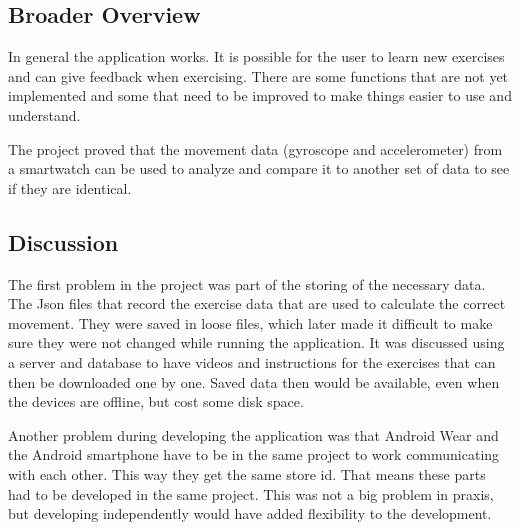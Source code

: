 \subsection{Broader Overview}
In general the application works. It is possible for the user to learn new exercises and can give feedback when exercising. There are some functions that are not yet implemented and some that need to be improved to make things easier to use and understand.

The project proved that the movement data (gyroscope and accelerometer) from a smartwatch can be used to analyze and compare it to another set of data to see if they are identical.


\subsection{Discussion}
The first problem in the project was part of the storing of the necessary data. The Json files that record the exercise data that are used to calculate the correct movement. They were saved in loose files, which later made it difficult to make sure they were not changed while running the application. It was discussed using a server and database to have videos and instructions for the exercises that can then be downloaded one by one. Saved data then would be available, even when the devices are offline, but cost some disk space.

Another problem during developing the application was that Android Wear and the Android smartphone have to be in the same project to work communicating with each other. This way they get the same store id. That means these parts had to be developed in the same project. This was not a big problem in praxis, but developing independently would have added flexibility to the development.

